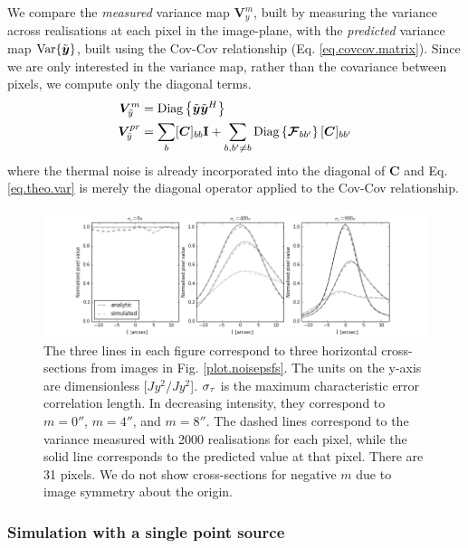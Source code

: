 We compare the \emph{measured} variance map $\bm{V}_y^m$, built by measuring the variance across realisations at each pixel in the image-plane, with the \emph{predicted} variance map $\textrm{Var}\{\tilde{\bm{{{y}}}}\}$, built using the Cov-Cov relationship (Eq. \ref{eq.covcov.matrix}). Since we are only interested in the variance map, rather than the covariance between pixels, we compute only the diagonal terms.
\begin{alignat}{2}
\bm{V}_{\tilde{y}}^m &= \text{Diag}\left\{\tilde{\bm{{{y}}}}\tilde{\bm{{{y}}}}^H\right\} \label{eq.meas.var}\\
\bm{V}_{\tilde{y}}^{pr} &= \sum_b [\bm{C}] _{bb}\bm{\mathrm{I}} + \sum_{b,b'\ne b}\text{Diag}\left\{\bm{\mathcal{F}}_{bb'}\right\}[\bm{C}]_{bb'}\label{eq.theo.var}
\end{alignat}
where the thermal noise is already incorporated into the diagonal of $\bm{C}$ and Eq. \ref{eq.theo.var} is merely the diagonal operator applied to the Cov-Cov relationship. 



\begin{figure}[h!]
\centering
\includegraphics[width=\textwidth]{images/cross_sections1.png}
\caption{\label{plot.cross-sections} The three lines in each figure correspond to three horizontal cross-sections from images in Fig. \ref{plot.noisepsfs}. {The units on the y-axis are dimensionless [$Jy^2/Jy^2$].} $\sigma_\tau$ is the maximum characteristic error correlation length. In decreasing intensity, they correspond to  $m=0''$, $m=4''$, and $m=8''$. The dashed lines correspond to the variance measured with 2000 realisations for each pixel, while the solid line corresponds to the predicted value at that pixel. There are 31 pixels. We do not show cross-sections for negative $m$ due to image symmetry about the origin.}
\end{figure}



\subsubsection{Simulation with a single point source}

